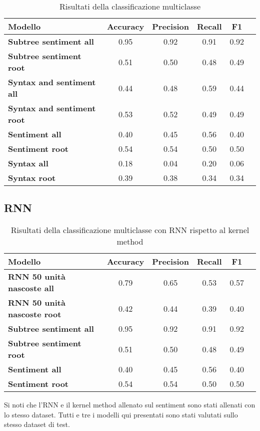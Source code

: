 \begin{table}[H]
    \centering
    \begin{tabular}{|l|c|c|c|c|c|}
    \hline
    \textbf{Modello} & \textbf{Accuracy} & \textbf{Precision} & \textbf{Recall} & \textbf{F1} \\
    \hline
    \textbf{Subtree sentiment all} & 0.95 & 0.92 & 0.91 & 0.92 \\
    \textbf{Subtree sentiment root} & 0.51 & 0.50 & 0.48 & 0.49 \\
    \hline

    \textbf{Syntax and sentiment all} & 0.44 & 0.48 & 0.59 & 0.44 \\
    \textbf{Syntax and sentiment root} & 0.53 & 0.52 & 0.49 & 0.49 \\
    \hline

    \textbf{Sentiment all} & 0.40 & 0.45 & 0.56 & 0.40 \\
    \textbf{Sentiment root} & 0.54 & 0.54 & 0.50 & 0.50 \\
    \hline

    \textbf{Syntax all} & 0.18 & 0.04 & 0.20 & 0.06 \\
    \textbf{Syntax root} & 0.39 & 0.38 & 0.34 & 0.34 \\
    \hline
    \end{tabular}
    \caption{Risultati della classificazione multiclasse}
\end{table}

\subsection{RNN}

\begin{table}[H]
    \centering
    \begin{tabular}{|l|c|c|c|c|c|}
    \hline
    \textbf{Modello} & \textbf{Accuracy} & \textbf{Precision} & \textbf{Recall} & \textbf{F1} \\
    \hline
    \textbf{RNN 50 unità nascoste all} & 0.79 & 0.65 & 0.53 & 0.57 \\
    \textbf{RNN 50 unità nascoste root} & 0.42 & 0.44 & 0.39 & 0.40 \\
    \hline

    \textbf{Subtree sentiment all} & 0.95 & 0.92 & 0.91 & 0.92 \\
    \textbf{Subtree sentiment root} & 0.51 & 0.50 & 0.48 & 0.49 \\
    \hline

    \textbf{Sentiment all} & 0.40 & 0.45 & 0.56 & 0.40 \\
    \textbf{Sentiment root} & 0.54 & 0.54 & 0.50 & 0.50 \\
    \hline
    \end{tabular}
    \caption{Risultati della classificazione multiclasse con RNN rispetto al
    kernel method}
\end{table}
 
Si noti che l'RNN e il kernel method allenato sul sentiment sono stati allenati
con lo stesso dataset. Tutti e tre i modelli qui presentati sono
stati valutati sullo stesso dataset di test.
